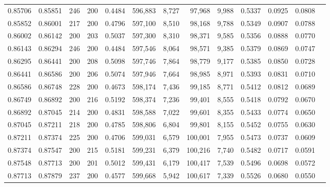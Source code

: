 \begin{tabular}{rrrrrrrrrrrrr}
0.85706 & 0.85851 &    246 & 200 &                                     0.4484 & 596,883 &   8,727 &  97,968 &   9,988 & 0.5337 & 0.0925 & 0.0808 \\
0.85852 & 0.86001 &    217 & 200 &                                     0.4796 & 597,100 &   8,510 &  98,168 &   9,788 & 0.5349 & 0.0907 & 0.0788 \\
0.86002 & 0.86142 &    200 & 203 &                                     0.5037 & 597,300 &   8,310 &  98,371 &   9,585 & 0.5356 & 0.0888 & 0.0770 \\
0.86143 & 0.86294 &    246 & 200 &                                     0.4484 & 597,546 &   8,064 &  98,571 &   9,385 & 0.5379 & 0.0869 & 0.0747 \\
0.86295 & 0.86441 &    200 & 208 &                                     0.5098 & 597,746 &   7,864 &  98,779 &   9,177 & 0.5385 & 0.0850 & 0.0728 \\
0.86441 & 0.86586 &    200 & 206 &                                     0.5074 & 597,946 &   7,664 &  98,985 &   8,971 & 0.5393 & 0.0831 & 0.0710 \\
0.86586 & 0.86748 &    228 & 200 &                                     0.4673 & 598,174 &   7,436 &  99,185 &   8,771 & 0.5412 & 0.0812 & 0.0689 \\
0.86749 & 0.86892 &    200 & 216 &                                     0.5192 & 598,374 &   7,236 &  99,401 &   8,555 & 0.5418 & 0.0792 & 0.0670 \\
0.86892 & 0.87045 &    214 & 200 &                                     0.4831 & 598,588 &   7,022 &  99,601 &   8,355 & 0.5433 & 0.0774 & 0.0650 \\
0.87045 & 0.87211 &    218 & 200 &                                     0.4785 & 598,806 &   6,804 &  99,801 &   8,155 & 0.5452 & 0.0755 & 0.0630 \\
0.87211 & 0.87374 &    225 & 200 &                                     0.4706 & 599,031 &   6,579 & 100,001 &   7,955 & 0.5473 & 0.0737 & 0.0609 \\
0.87374 & 0.87547 &    200 & 215 &                                     0.5181 & 599,231 &   6,379 & 100,216 &   7,740 & 0.5482 & 0.0717 & 0.0591 \\
0.87548 & 0.87713 &    200 & 201 &                                     0.5012 & 599,431 &   6,179 & 100,417 &   7,539 & 0.5496 & 0.0698 & 0.0572 \\
0.87713 & 0.87879 &    237 & 200 &                                     0.4577 & 599,668 &   5,942 & 100,617 &   7,339 & 0.5526 & 0.0680 & 0.0550 \\

\end{tabular}
